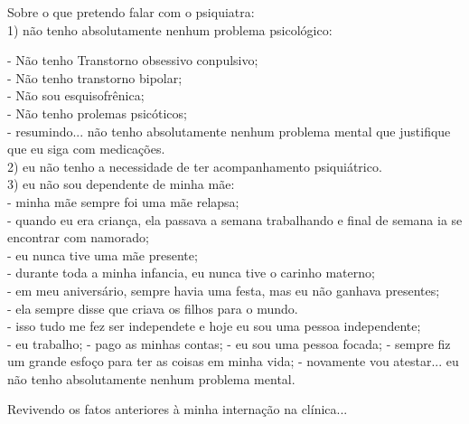 \documentclass{book}
\begin{document}
Sobre o que pretendo falar com o psiquiatra: \\

1) não tenho absolutamente nenhum problema psicológico:

- Não tenho Transtorno obsessivo conpulsivo; \\
- Não tenho transtorno bipolar; \\
- Não sou esquisofrênica; \\
- Não tenho prolemas psicóticos; \\
- resumindo... não tenho absolutamente nenhum problema mental que justifique que eu siga com medicações. \\

2) eu não tenho a necessidade de ter acompanhamento psiquiátrico. \\

3) eu não sou dependente de minha mãe: \\

- minha mãe sempre foi uma mãe relapsa; \\
- quando eu era criança, ela passava a semana trabalhando e final de semana ia se encontrar com namorado; \\
- eu nunca tive uma mãe presente; \\
- durante toda a minha infancia, eu nunca tive o carinho materno; \\
- em meu aniversário, sempre havia uma festa, mas eu não ganhava presentes; \\
- ela sempre disse que criava os filhos para o mundo. \\

- isso tudo me fez ser independete e hoje eu sou uma pessoa independente; \\

- eu trabalho;
- pago as minhas contas;
- eu sou uma pessoa focada;
- sempre fiz um grande esfoço para ter as coisas em minha vida;
- novamente vou atestar... eu não tenho absolutamente nenhum problema mental.







Revivendo os fatos anteriores à minha internação na clínica... \\
\end{document}
